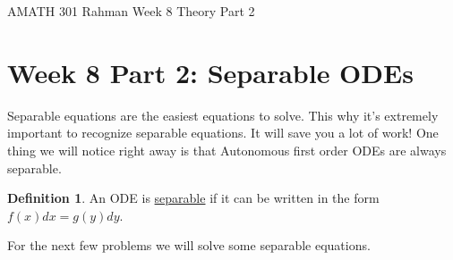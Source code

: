 \documentclass[reqno]{amsart}
\theoremstyle{definition}
\newtheorem{definition}{Definition}
\begin{document}
\begin{flushleft}
{\sc \Large AMATH 301 Rahman} \hfill Week 8 Theory Part 2
\bigskip
\end{flushleft}

\newcommand{\R}{\mathbb{R}}
\newcommand{\N}{\mathbb{N}}
\newcommand{\Z}{\mathbb{Z}}
\newcommand{\Q}{\mathbb{Q}}
\renewcommand{\CancelColor}{\color{red}}
\newcommand{\?}{\stackrel{?}{=}}
\renewcommand{\varphi}{\phi}
\newcommand{\card}{\text{Card}}
\newcommand{\bigzero}{\text{\Huge 0}}
\newcommand{\curvearrowdown}{{\color{red}\rotatebox{90}{$\curvearrowleft$}}}
\newcommand{\curvearrowup}{{\color{red}\rotatebox{90}{$\curvearrowright$}}}



\section*{Week 8 Part 2:  Separable ODEs}

Separable equations are the easiest equations to solve.  This why it's extremely
important to recognize separable equations.  It will save you a lot of work!
One thing we will notice right away is that Autonomous first order ODEs are
always separable.

\begin{definition}
An ODE is \underline{separable} if it can be written in the form $f(x)dx = g(y)dy$.
\end{definition}

For the next few problems we will solve some separable equations.
\end{document}
